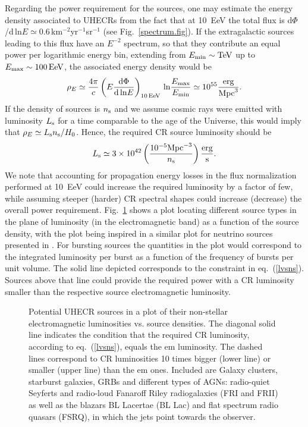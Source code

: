 \documentclass[twoside,12pt]{article}
\newcommand{\be}{\begin{equation}}
\newcommand{\ee}{\end{equation}}
\begin{document}
Regarding the power requirement for the sources, one may estimate the energy density associated to UHECRs from the fact that at 10~EeV the total flux is d$\Phi$/d\,ln$E\simeq 0.6$\,km$^{-2}$yr$^{-1}$sr$^{-1}$ (see Fig.~\ref{spectrum.fig}). If the extragalactic sources leading to this flux have an $E^{-2}$ spectrum, so that they contribute an equal power per logarithmic energy bin, extending  from $E_{\rm min}\sim{\rm TeV}$ up to $E_{\rm max}\sim 100\,{\rm EeV}$, the associated energy density would be 
\be 
\rho_E\simeq \frac{4\pi}{c}\left(E \frac{{\rm d}\Phi}{{\rm d\,ln}E}\right)_{10\,{\rm EeV}}\,{\rm ln}\frac{E_{\rm max}}{E_{\rm min}}\simeq 10^{55}\frac{\rm erg}{{\rm Mpc}^3}.
\ee
If the density of sources is $n_{\rm s}$ and we assume cosmic rays were emitted with luminosity $L_{\rm s}$ for a time comparable to the age of the Universe, this would imply that $\rho_E\simeq  L_{\rm s} n_{\rm s}/H_0$. Hence, the required CR source luminosity should be
\be 
L_{\rm s}\simeq 3\times 10^{42}\left(\frac{10^{-5}{\rm Mpc}^{-3}}{n_{\rm s}}\right) \frac{\rm erg}{\rm s}.
\label{lvsns}
\ee
We note that accounting for propagation energy losses in the flux normalization performed at 10~EeV could increase the required luminosity by a factor of few, while assuming steeper (harder) CR spectral shapes could increase (decrease) the overall power requirement. 
Fig.~\ref{sources.fig} shows a plot
locating different source types in the plane of luminosity (in the electromagnetic band) as a function of the source density, with the plot being inspired in a similar plot for neutrino sources presented in \cite{kowal,gaisser}.  For bursting sources the quantities in the plot would correspond to the integrated luminosity per burst as a function of the frequency of bursts per unit volume. The solid line depicted corresponds to the constraint in eq.~(\ref{lvsns}). Sources above that line could provide the required power with a CR luminosity smaller than the respective source electromagnetic luminosity.



\begin{figure}[tb]
\begin{center}
\begin{minipage}[t]{8 cm}
\centerline{}
\end{minipage}
\caption{Potential UHECR sources in a plot of their non-stellar electromagnetic  luminosities vs. source densities. The diagonal solid line indicates the condition that  the required CR luminosity, according to eq.~(\ref{lvsns}), equals the em luminosity. The dashed lines correspond to CR luminosities 10 times bigger (lower line) or smaller (upper line) than the em ones. Included are Galaxy clusters, starburst galaxies, GRBs and different types of AGNs:  radio-quiet Seyferts and radio-loud  Fanaroff Riley radiogalaxies (FRI and FRII) as well as the  blazars BL Lacertae (BL Lac) and flat spectrum radio quasars (FSRQ), in which the jets point towards the observer.  \label{sources.fig}}
\end{center}
\end{figure}
\end{document}
